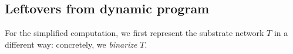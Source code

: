 \documentclass[9pt,twocolumn]{scrartcl}
\newcommand{\Tree}{\ensuremath{T}}
\begin{document}
\begin{appendix}

\subsection{Leftovers from dynamic program}
For the simplified computation, we first represent the substrate network
$\Tree$ in a different way: concretely, we \emph{binarize} $\Tree$.


\end{appendix}
\end{document}
